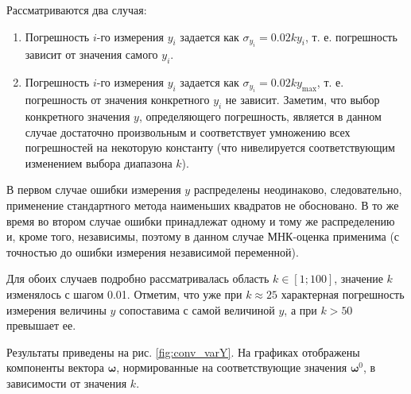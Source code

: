 \documentclass[tikz,10pt,a4paper]{article}
\newcommand{\bomega}{\boldsymbol{\omega}}
\begin{document}
Рассматриваются два случая:
\begin{enumerate}
  \item Погрешность $i$-го измерения $y_i$ задается как $\sigma_{y_i} = 0.02ky_i$, т. е.
	погрешность зависит от значения самого $y_i$.
  \item Погрешность $i$-го измерения $y_i$ задается как $\sigma_{y_i} = 0.02ky_{\max}$,
	т. е. погрешность от значения конкретного $y_i$ не зависит. Заметим, что выбор
	конкретного значения $y$, определяющего погрешность, является в данном случае
	достаточно произвольным и соответствует умножению всех погрешностей на некоторую константу
	(что нивелируется соответствующим изменением выбора диапазона $k$).
\end{enumerate}

В первом случае ошибки измерения $y$ распределены неодинаково, следовательно, применение
стандартного метода наименьших квадратов не обосновано. В то же время во втором случае
ошибки принадлежат одному и тому же распределению и, кроме того, независимы, поэтому
в данном случае МНК-оценка применима (с точностью до ошибки измерения независимой
переменной).

Для обоих случаев подробно рассматривалась область $k \in [1; 100]$, значение $k$
изменялось с шагом 0.01. Отметим, что уже при $k \approx 25$ характерная погрешность
измерения величины $y$ сопоставима с самой величиной $y$, а при $k > 50$ превышает ее.

Результаты приведены на рис. \ref{fig:conv_varY}.
На графиках отображены компоненты вектора $\bomega$, нормированные на
соответствующие значения $\bomega^0$, в зависимости от значения $k$.
\end{document}
